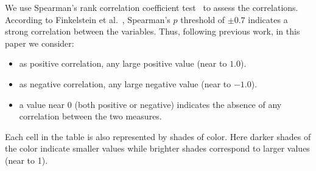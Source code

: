 We use Spearman's rank correlation coefficient test~\cite{} to assess the correlations. According to Finkelstein et al.~\cite{}, Spearman’s $p$ threshold of $\pm 0.7$ indicates a strong correlation between the variables. Thus, following previous work, in this paper we consider:

\begin{itemize}
    \item as positive correlation, any large positive value (near to $1.0$). %
    \item as negative correlation, any large negative value (near to $-1.0$). 
    \item a value near $0$ (both positive or negative) indicates the absence of any correlation between the two measures. %
\end{itemize}

Each cell in the table is also represented by shades of color. Here darker shades of the color indicate smaller values while brighter shades correspond to larger values (near to 1).




